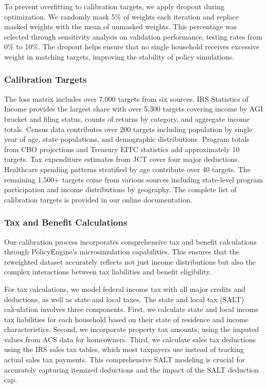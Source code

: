 To prevent overfitting to calibration targets, we apply dropout during optimization. We randomly mask 5\% of weights each iteration and replace masked weights with the mean of unmasked weights. This percentage was selected through sensitivity analysis on validation performance, testing rates from 0\% to 10\%. The dropout helps ensure that no single household receives excessive weight in matching targets, improving the stability of policy simulations.

\subsubsection{Calibration Targets}

The loss matrix includes over 7,000 targets from six sources. IRS Statistics of Income provides the largest share with over 5,300 targets covering income by AGI bracket and filing status, counts of returns by category, and aggregate income totals. Census data contributes over 200 targets including population by single year of age, state populations, and demographic distributions. Program totals from CBO projections and Treasury EITC statistics add approximately 10 targets. Tax expenditure estimates from JCT cover four major deductions. Healthcare spending patterns stratified by age contribute over 40 targets. The remaining 1,500+ targets come from various sources including state-level program participation and income distributions by geography. The complete list of calibration targets is provided in our online documentation.

\subsubsection{Tax and Benefit Calculations}

Our calibration process incorporates comprehensive tax and benefit calculations through PolicyEngine's microsimulation capabilities. This ensures that the reweighted dataset accurately reflects not just income distributions but also the complex interactions between tax liabilities and benefit eligibility.

For tax calculations, we model federal income tax with all major credits and deductions, as well as state and local taxes. The state and local tax (SALT) calculation involves three components. First, we calculate state and local income tax liabilities for each household based on their state of residence and income characteristics. Second, we incorporate property tax amounts, using the imputed values from ACS data for homeowners. Third, we calculate sales tax deductions using the IRS sales tax tables, which most taxpayers use instead of tracking actual sales tax payments. This comprehensive SALT modeling is crucial for accurately capturing itemized deductions and the impact of the SALT deduction cap.

